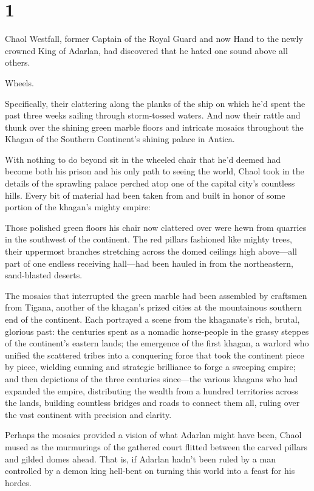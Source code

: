 
\chapter{1}

Chaol Westfall, former Captain of the Royal Guard and now Hand to the newly crowned King of Adarlan, had discovered that he hated one sound above all others.

Wheels.

Specifically, their clattering along the planks of the ship on which he'd spent the past three weeks sailing through storm-tossed waters. And now their rattle and thunk over the shining green marble floors and intricate mosaics throughout the Khagan of the Southern Continent's shining palace in Antica.

With nothing to do beyond sit in the wheeled chair that he'd deemed had become both his prison and his only path to seeing the world, Chaol took in the details of the sprawling palace perched atop one of the capital city's countless hills. Every bit of material had been taken from and built in honor of some portion of the khagan's mighty empire:

Those polished green floors his chair now clattered over were hewn from quarries in the southwest of the continent. The red pillars fashioned like mighty trees, their uppermost branches stretching across the domed ceilings high above---all part of one endless receiving hall---had been hauled in from the northeastern, sand-blasted deserts.

The mosaics that interrupted the green marble had been assembled by craftsmen from Tigana, another of the khagan's prized cities at the mountainous southern end of the continent. Each portrayed a scene from the khaganate's rich, brutal, glorious past: the centuries spent as a nomadic horse-people in the grassy steppes of the continent's eastern lands; the emergence of the first khagan, a warlord who unified the scattered tribes into a conquering force that took the continent piece by piece, wielding cunning and strategic brilliance to forge a sweeping empire; and then depictions of the three centuries since---the various khagans who had expanded the empire, distributing the wealth from a hundred territories across the lands, building countless bridges and roads to connect them all, ruling over the vast continent with precision and clarity.

Perhaps the mosaics provided a vision of what Adarlan might have been, Chaol mused as the murmurings of the gathered court flitted between the carved pillars and gilded domes ahead. That is, if Adarlan hadn't been ruled by a man controlled by a demon king hell-bent on turning this world into a feast for his hordes.

